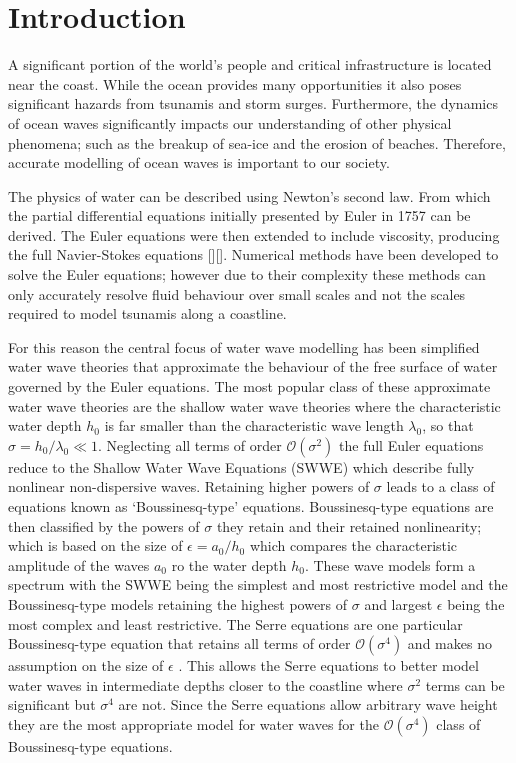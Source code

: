 \chapter{Introduction}
\label{chp:Introduction}

A significant portion of the world's people and critical infrastructure is located near the coast. While the ocean provides many opportunities it also poses significant hazards from tsunamis and storm surges. Furthermore, the dynamics of ocean waves significantly impacts our understanding of other physical phenomena; such as the breakup of sea-ice and the erosion of beaches. Therefore, accurate modelling of ocean waves is important to our society. 

The physics of water can be described using Newton's second law. From which the partial differential equations initially presented by Euler in 1757 \cite{Euler-1755-274} can be derived. The Euler equations were then extended to include viscosity, producing the full Navier-Stokes equations [][]. Numerical methods \cite{Chorin-1967-928,Taylor-Hood-1973-73,Bassi-1997-267} have been developed to solve the Euler equations; however due to their complexity these methods can only accurately resolve fluid behaviour over small scales and not the scales required to model tsunamis along a coastline. 

For this reason the central focus of water wave modelling has been simplified water wave theories that approximate the behaviour of the free surface of water governed by the Euler equations. The most popular class of these approximate water wave theories are the shallow water wave theories where the characteristic water depth $h_0$ is far smaller than the characteristic wave length $\lambda_0$, so that $\sigma = h_0 / \lambda_0 \ll 1$. Neglecting all terms of order $\mathcal{O}\left(\sigma ^2\right)$ the full Euler equations reduce to the Shallow Water Wave Equations (SWWE) \cite{Bonneton-Lannes-2009-16601} which describe fully nonlinear non-dispersive waves. Retaining higher powers of $\sigma$ leads to a class of equations known as `Boussinesq-type' equations. Boussinesq-type equations are then classified by the powers of $\sigma$ they retain and their retained nonlinearity; which is based on the size of $\epsilon= a_0 / h_0$ which compares the characteristic amplitude of the waves $a_0$ ro the water depth $h_0$. These wave models form a spectrum with the SWWE being the simplest and most restrictive model and the Boussinesq-type models retaining the highest powers of $\sigma$ and largest $\epsilon$ being the most complex and least restrictive. The Serre equations are one particular Boussinesq-type equation that retains all terms of order $\mathcal{O}\left(\sigma ^4\right)$ and makes no assumption on the size of $\epsilon$ \cite{Bonneton-Lannes-2009-16601}. This allows the Serre equations to better model water waves in intermediate depths closer to the coastline where $\sigma^2$ terms can be significant but $\sigma^4$ are not. Since the Serre equations allow arbitrary wave height they are the most appropriate model for water waves for the $\mathcal{O}\left(\sigma ^4\right)$ class of Boussinesq-type equations. 

